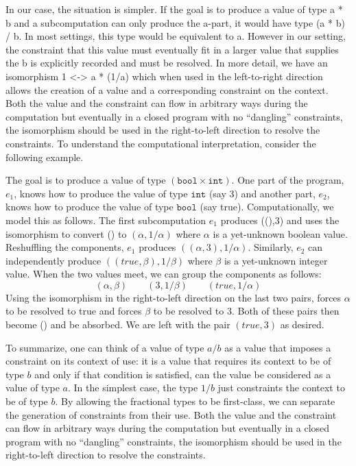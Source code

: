 \documentclass[preprint]{sigplanconf}
\begin{document}
In our case, the situation is simpler. If the goal is to produce a value of
type {{a * b}} and a subcomputation can only produce the {{a}}-part, it would
have type {{(a * b) / b}}. In most settings, this type would be equivalent to
{{a}}. However in our setting, the constraint that this value must eventually
fit in a larger value that supplies the {{b}} is explicitly recorded and must
be resolved. In more detail, we have an isomorphism {{ 1 <-> a * (1/a) }}
which when used in the left-to-right direction allows the creation of a value
and a corresponding constraint on the context.  Both the value and the
constraint can flow in arbitrary ways during the computation but eventually
in a closed program with no ``dangling'' constraints, the isomorphism should
be used in the right-to-left direction to resolve the constraints.  To
understand the computational interpretation, consider the following example.

The goal is to produce a value of type $(\texttt{bool} \times
\texttt{int})$. One part of the program, $e_1$, knows how to produce the
value of type $\texttt{int}$ (say {{3}}) and another part, $e_2$, knows how
to produce the value of type $\texttt{bool}$ (say true). Computationally, we
model this as follows. The first subcomputation $e_1$ produces {{((),3)}} and
uses the isomorphism to convert {{()}} to $(\alpha,1/\alpha)$ where $\alpha$
is a yet-unknown boolean value. Reshuffling the components, $e_1$ produces
$((\alpha,3), 1/\alpha)$. Similarly, $e_2$ can independently produce
$((true,\beta),1/\beta)$ where $\beta$ is a yet-unknown integer value.  When
the two values meet, we can group the components as follows:
\[
(\alpha,\beta)  \qquad (3,1/\beta)  \qquad (true,1/\alpha)
\]
Using the isomorphism in the right-to-left direction on the last two pairs,
forces $\alpha$ to be resolved to true and forces $\beta$ to be resolved to
{{3}}. Both of these pairs then become {{()}} and be absorbed. We are left
with the pair $(true,3)$ as desired.

To summarize, one can think of a value of type $a/b$ as a value that imposes
a constraint on its context of use: it is a value that requires its context
to be of type $b$ and only if that condition is satisfied, can the value be
considered as a value of type $a$. In the simplest case, the type $1/b$ just
constraints the context to be of type $b$. By allowing the fractional types
to be first-class, we can separate the generation of constraints from their
use. Both the value and the constraint can flow in arbitrary ways during the
computation but eventually in a closed program with no ``dangling''
constraints, the isomorphism should be used in the right-to-left direction to
resolve the constraints.
\end{document}
